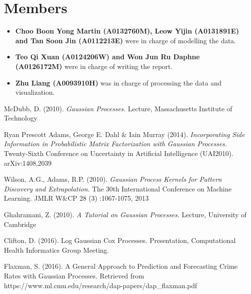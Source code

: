 \documentclass[a4paper, 10pt, conference]{ieeeconf}
\begin{document}
	\section{Members}
	\begin{itemize}
		\item {\bf Choo Boon Yong Martin (A0132760M), Leow Yijin (A0131891E) and Tan Soon Jin (A0112213E)} were in charge of modelling the data.
		\item {\bf Teo Qi Xuan (A0124206W) and Won Jun Ru Daphne (A0126172M)} were in charge of writing the report.
		\item {\bf Zhu Liang (A0093910H)} was in charge of processing the data and visualization.
	\end{itemize}

	\begin{thebibliography}{9}
	McDubb, D. (2010).
	\textit{Gaussian Processes.}
	Lecture, Massachusetts Institute of Technology
	
	Ryan Prescott Adams, George E. Dahl \& Iain Murray (2014).
	\textit{Incorporating Side Information in Probabilistic Matrix Factorization with Gaussian Processes.}
	Twenty-Sixth Conference on Uncertainty in Artificial Intelligence (UAI2010). arXiv:1408.2039

	Wilson, A.G., Adams, R.P. (2010).
	\textit{Gaussian Process Kernels for Pattern Discovery and Extrapolation.}
	The 30th International Conference on Machine Learning. JMLR W\&CP 28 (3) :1067-1075, 2013
	
	Ghahramani, Z. (2010).
	\textit{A Tutorial on Gaussian Processes.}
	Lecture, University of Cambridge
	
	Clifton, D. (2016).
	Log Gaussian Cox Processes. Presentation, Computational Health Informatics Group Meeting.

	Flaxman, S. (2016).
	A General Approach to Prediction and Forecasting Crime Rates with Gaussian Processes. Retrieved from https://www.ml.cmu.edu/research/dap-papers/dap\_flaxman.pdf
	
	\end{thebibliography}
\end{document}
